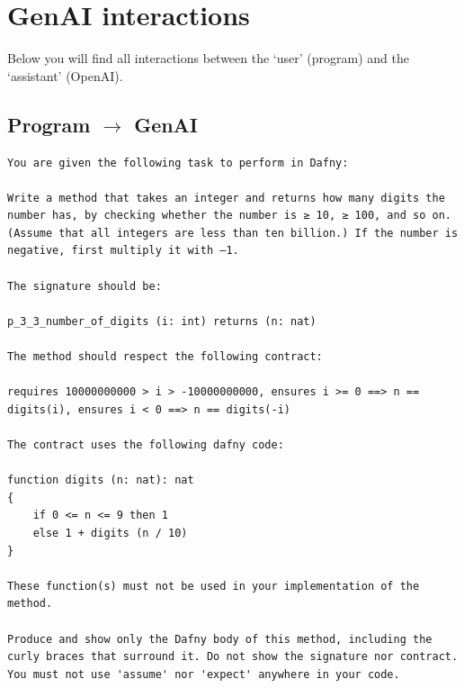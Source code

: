 \documentclass{article}
\begin{document}
\section*{GenAI interactions}
Below you will find all interactions between the `user' (program) and the `assistant' (OpenAI).
\subsection*{Program $\rightarrow$ GenAI}
\begin{lstlisting}
You are given the following task to perform in Dafny:

Write a method that takes an integer and returns how many digits the number has, by checking whether the number is ≥ 10, ≥ 100, and so on. (Assume that all integers are less than ten billion.) If the number is negative, first multiply it with –1.

The signature should be:

p_3_3_number_of_digits (i: int) returns (n: nat)

The method should respect the following contract:

requires 10000000000 > i > -10000000000, ensures i >= 0 ==> n == digits(i), ensures i < 0 ==> n == digits(-i)

The contract uses the following dafny code:

function digits (n: nat): nat
{
    if 0 <= n <= 9 then 1
    else 1 + digits (n / 10)
}

These function(s) must not be used in your implementation of the method.

Produce and show only the Dafny body of this method, including the curly braces that surround it. Do not show the signature nor contract. You must not use 'assume' nor 'expect' anywhere in your code.
\end{lstlisting}
\end{document}
